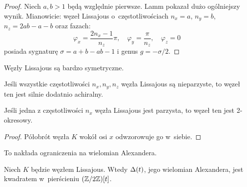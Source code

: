 \begin{proof}
    Niech $a, b > 1$ będą względnie pierwsze.
    Lamm \cite{lamm1997} pokazał dużo ogólniejszy wynik.
    Mianowicie: węzeł Lissajous o~częstotliwościach $n_x = a$, $n_y = b$, $n_z = 2ab-a-b$ oraz fazach:
    \begin{equation}
        \varphi_x = \frac{2n_x-1}{n_z} \pi, \quad
        \varphi_y = \frac{\pi}{n_z}, \quad
        \varphi_z = 0
    \end{equation}
    posiada sygnaturę $\sigma = a+b-ab-1$ i genus $g = -\sigma/2$.
%
%
\end{proof}

Węzły Lissajous są bardzo symetryczne.

\begin{proposition}
%
\label{prp:lissajus_odd}%
    Jeśli wszystkie częstotliwości $n_x, n_y, n_z$ węzła Lissajous są nieparzyste, to węzeł ten jest silnie dodatnio achiralny.
\end{proposition}

\begin{proposition}
%
\label{prp:lissajous_two_periodic}%
    Jeśli jedna z częstotliwości $n_x$ węzła Lissajous jest parzysta, to węzeł ten jest 2-okresowy.
\end{proposition}

\begin{proof}
    Półobrót węzła $K$ wokół osi $x$ odwzorowuje go w~siebie.
\end{proof}

To nakłada ograniczenia na wielomian Alexandera.

\begin{proposition}
\label{prp:lissajous_alexander}%
    Niech $K$ będzie węzłem Lissajous.
    Wtedy $\Delta(t)$, jego wielomian Alexandera, jest kwadratem w~pierścieniu $(\mathbb Z/2\mathbb Z)[t]$.
\end{proposition}

